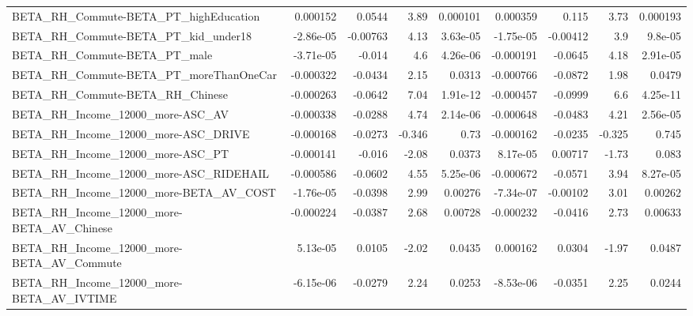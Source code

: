 \begin{tabular}{lrrrrrrrr}
BETA\_RH\_Commute-BETA\_PT\_highEducation              &    0.000152 &       0.0544 &     3.89 & 0.000101 &   0.000359 &       0.115 &         3.73 &      0.000193 \\
BETA\_RH\_Commute-BETA\_PT\_kid\_under18                &   -2.86e-05 &     -0.00763 &     4.13 & 3.63e-05 &  -1.75e-05 &    -0.00412 &          3.9 &       9.8e-05 \\
BETA\_RH\_Commute-BETA\_PT\_male                       &   -3.71e-05 &       -0.014 &      4.6 & 4.26e-06 &  -0.000191 &     -0.0645 &         4.18 &      2.91e-05 \\
BETA\_RH\_Commute-BETA\_PT\_moreThanOneCar             &   -0.000322 &      -0.0434 &     2.15 &   0.0313 &  -0.000766 &     -0.0872 &         1.98 &        0.0479 \\
BETA\_RH\_Commute-BETA\_RH\_Chinese                    &   -0.000263 &      -0.0642 &     7.04 & 1.91e-12 &  -0.000457 &     -0.0999 &          6.6 &      4.25e-11 \\
BETA\_RH\_Income\_12000\_more-ASC\_AV                   &   -0.000338 &      -0.0288 &     4.74 & 2.14e-06 &  -0.000648 &     -0.0483 &         4.21 &      2.56e-05 \\
BETA\_RH\_Income\_12000\_more-ASC\_DRIVE                &   -0.000168 &      -0.0273 &   -0.346 &     0.73 &  -0.000162 &     -0.0235 &       -0.325 &         0.745 \\
BETA\_RH\_Income\_12000\_more-ASC\_PT                   &   -0.000141 &       -0.016 &    -2.08 &   0.0373 &   8.17e-05 &     0.00717 &        -1.73 &         0.083 \\
BETA\_RH\_Income\_12000\_more-ASC\_RIDEHAIL             &   -0.000586 &      -0.0602 &     4.55 & 5.25e-06 &  -0.000672 &     -0.0571 &         3.94 &      8.27e-05 \\
BETA\_RH\_Income\_12000\_more-BETA\_AV\_COST             &   -1.76e-05 &      -0.0398 &     2.99 &  0.00276 &  -7.34e-07 &    -0.00102 &         3.01 &       0.00262 \\
BETA\_RH\_Income\_12000\_more-BETA\_AV\_Chinese          &   -0.000224 &      -0.0387 &     2.68 &  0.00728 &  -0.000232 &     -0.0416 &         2.73 &       0.00633 \\
BETA\_RH\_Income\_12000\_more-BETA\_AV\_Commute          &    5.13e-05 &       0.0105 &    -2.02 &   0.0435 &   0.000162 &      0.0304 &        -1.97 &        0.0487 \\
BETA\_RH\_Income\_12000\_more-BETA\_AV\_IVTIME           &   -6.15e-06 &      -0.0279 &     2.24 &   0.0253 &  -8.53e-06 &     -0.0351 &         2.25 &        0.0244 \\

\end{tabular}
